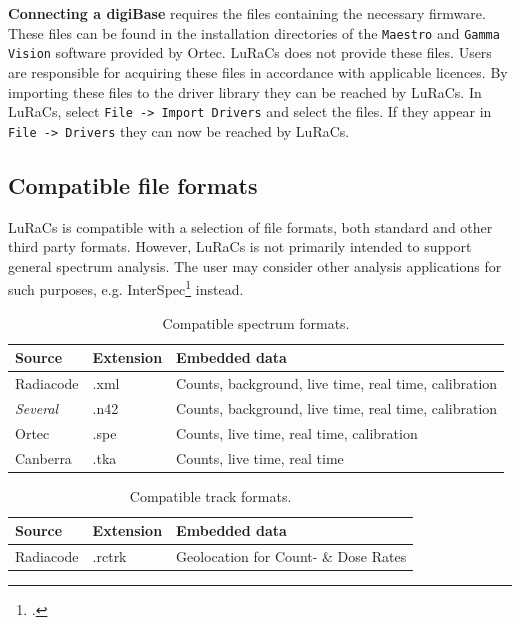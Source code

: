 \textbf{Connecting a digiBase} requires the files containing the necessary firmware. These files can be found in the installation directories of the \texttt{Maestro} and \texttt{Gamma Vision} software provided by Ortec. LuRaCs does not provide these files. Users are responsible for acquiring these files in accordance with applicable licences. By importing these files to the driver library they can be reached by LuRaCs. In LuRaCs, select \texttt{File -> Import Drivers} and select the files. If they appear in \texttt{File -> Drivers} they can now be reached by LuRaCs.

\subsection{Compatible file formats}
LuRaCs is compatible with a selection of file formats, both standard and other third party formats. However, LuRaCs is not primarily intended to support general spectrum analysis. The user may consider other analysis applications for such purposes, e.g. InterSpec\footcite{SandialabsInterSpec2025} instead. 

\begin{table}[H]
\centering
\caption{Compatible spectrum formats.}
\label{tab:supported_formats}
\begin{tabular}{@{}lll@{}}
\toprule
\textbf{Source}            & \textbf{Extension} & \textbf{Embedded data}                                        \\ \midrule
Radiacode         & .xml      & Counts, background, live time, real time, calibration \\
\textit{Several}             & .n42      & Counts, background, live time, real time, calibration \\
Ortec    & .spe      & Counts, live time, real time, calibration             \\
Canberra & .tka      & Counts, live time, real time                          \\ \bottomrule
\end{tabular}
\end{table}

\begin{table}[H]
\centering
\caption{Compatible track formats.}
\label{tab:supported_track_formats}
\begin{tabular}{@{}lll@{}}
\toprule
\textbf{Source}            & \textbf{Extension} & \textbf{Embedded data} \\ \midrule
Radiacode         & .rctrk & Geolocation for Count- \& Dose Rates \\ \bottomrule
\end{tabular}
\end{table}

